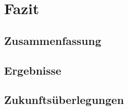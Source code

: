 \chapter{Fazit}
\label{fazit}

\section{Zusammenfassung}

\section{Ergebnisse}

\section{Zukunftsüberlegungen}
